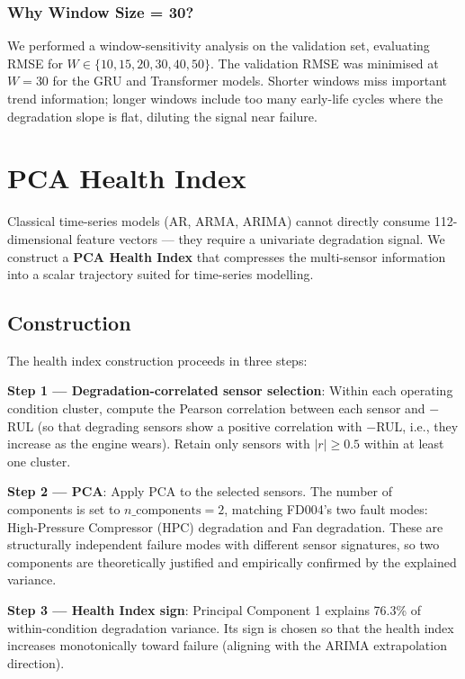 \documentclass[12pt,a4paper]{report}
\begin{document}
\subsection{Why Window Size = 30?}

We performed a window-sensitivity analysis on the validation set, evaluating RMSE for $W \in \{10, 15, 20, 30, 40, 50\}$. The validation RMSE was minimised at $W = 30$ for the GRU and Transformer models. Shorter windows miss important trend information; longer windows include too many early-life cycles where the degradation slope is flat, diluting the signal near failure.

\chapter{PCA Health Index}
\label{chap:health}

Classical time-series models (AR, ARMA, ARIMA) cannot directly consume 112-dimensional feature vectors — they require a univariate degradation signal. We construct a \textbf{PCA Health Index} that compresses the multi-sensor information into a scalar trajectory suited for time-series modelling.

\section{Construction}

The health index construction proceeds in three steps:

\textbf{Step 1 — Degradation-correlated sensor selection}: Within each operating condition cluster, compute the Pearson correlation between each sensor and $-$RUL (so that degrading sensors show a positive correlation with $-$RUL, i.e., they increase as the engine wears). Retain only sensors with $|r| \geq 0.5$ within at least one cluster.

\textbf{Step 2 — PCA}: Apply PCA to the selected sensors. The number of components is set to $n\_\text{components} = 2$, matching FD004's two fault modes: High-Pressure Compressor (HPC) degradation and Fan degradation. These are structurally independent failure modes with different sensor signatures, so two components are theoretically justified and empirically confirmed by the explained variance.

\textbf{Step 3 — Health Index sign}: Principal Component 1 explains 76.3\% of within-condition degradation variance. Its sign is chosen so that the health index increases monotonically toward failure (aligning with the ARIMA extrapolation direction).
\end{document}
